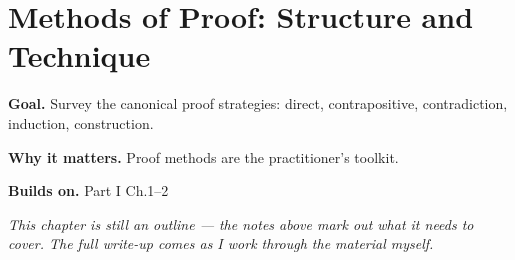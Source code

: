 \chapter{Methods of Proof: Structure and Technique}
\label{ch:01-mathematical-logic-and-proof-theory-03}

\begin{chapterintro}
\textbf{Goal.} Survey the canonical proof strategies: direct, contrapositive, contradiction, induction, construction.

\textbf{Why it matters.} Proof methods are the practitioner's toolkit.

\textbf{Builds on.} Part I Ch.1–2
\end{chapterintro}

\textit{This chapter is still an outline --- the notes above mark out what it needs to cover. The full write-up comes as I work through the material myself.}
